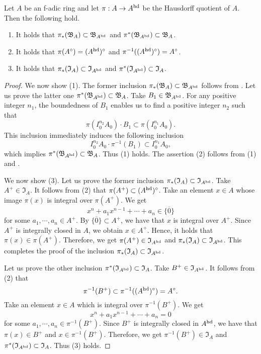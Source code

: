 \begin{prop}\label{p-hd-open}
Let $A$ be an f-adic ring and let $\pi:A \to A^{{\operatorname{hd}}}$ 
be the Hausdorff quotient of $A$. 
Then the following hold. 
\begin{enumerate}
\item 
It holds that $\pi_*(\mathfrak B_A)\subset \mathfrak B_{A^{{\operatorname{hd}}}}$ 
and 
$\pi^*(\mathfrak B_{A^{{\operatorname{hd}}}}) \subset \mathfrak B_A$. 
\item 
It holds that 
$\pi(A^{\circ})=(A^{{\operatorname{hd}}})^{\circ}$ and 
$\pi^{-1}((A^{{\operatorname{hd}}})^{\circ})=A^{\circ}$. 
\item 
It holds that $\pi_*(\mathfrak I_A)\subset \mathfrak I_{A^{{\operatorname{hd}}}}$ 
and 
$\pi^*(\mathfrak I_{A^{{\operatorname{hd}}}}) \subset \mathfrak I_A$.
\end{enumerate}
\end{prop}


\begin{proof}
We now show (1). 
The former inclusion $\pi_*(\mathfrak B_A)\subset \mathfrak B_{A^{{\operatorname{hd}}}}$ 
follows from \cite[Lemma 1.8(i)]{Hub93}. 
Let us prove the latter one $\pi^*(\mathfrak B_{A^{{\operatorname{hd}}}}) \subset \mathfrak B_A$. 
Take $B_1 \in \mathfrak B_{A^{{\operatorname{hd}}}}$. 
For any positive integer $n_1$, 
the boundedness of $B_1$ enables us 
to find a positive integer $n_2$ such that 
$$\pi(I_0^{n_2}A_0) \cdot B_1 \subset \pi(I_0^{n_1}A_0).$$
This inclusion immediately induces the following inclusion
$$I_0^{n_2}A_0 \cdot \pi^{-1}(B_1) \subset I_0^{n_1}A_0,$$
which implies $\pi^*(\mathfrak B_{A^{{\operatorname{hd}}}}) \subset \mathfrak B_A$. 
Thus (1) holds. 
The assertion (2) follows from (1) and \cite[Corollary 1.3(iii)]{Hub93}. 

We now show (3). 
Let us prove the former inclusion 
$\pi_*(\mathfrak I_A)\subset \mathfrak I_{A^{{\operatorname{hd}}}}$. 
Take $A^+ \in \mathfrak I_A$. 
It follows from (2) that $\pi(A^+) \subset (A^{{\operatorname{hd}}})^{\circ}$. 
Take an element $x \in A$ whose image 
$\pi(x)$ is integral over $\pi(A^+)$. 
We get 
$$x^n+a_1x^{n-1}+\cdots+a_n \in \overline{\{0\}}$$
for some $a_1, \cdots, a_n \in A^+$. 
By $\overline{\{0\}} \subset A^+$, we have that $x$ is integral over $A^+$. 
Since $A^+$ is integrally closed in $A$, 
we obtain $x \in A^+$. 
Hence, it holds that $\pi(x) \in \pi(A^+)$. 
Therefore, we get $\pi(A^+) \in \mathfrak I_{A^{{\operatorname{hd}}}}$ and 
$\pi_*(\mathfrak I_A) \subset \mathfrak I_{A^{{\operatorname{hd}}}}$. 
This completes the proof of the inclusion $\pi_*(\mathfrak I_A)\subset \mathfrak I_{A^{{\operatorname{hd}}}}$. 

Let us prove the other inclusion 
$\pi^*(\mathfrak I_{A^{{\operatorname{hd}}}}) \subset \mathfrak I_A$. 
Take $B^+ \in \mathfrak I_{A^{{\operatorname{hd}}}}$. 
It follows from (2) that 
$$\pi^{-1}(B^+) \subset \pi^{-1}((A^{{\operatorname{hd}}})^{\circ})=A^{\circ}.$$ 
Take an element $x \in A$ which is integral over $\pi^{-1}(B^+)$. 
We get 
$$x^n+a_1x^{n-1}+\cdots+a_n=0$$
for some $a_1, \cdots, a_n \in \pi^{-1}(B^+)$. 
Since $B^+$ is integrally closed in $A^{{\operatorname{hd}}}$, 
we have that $\pi(x) \in B^+$ and $x \in \pi^{-1}(B^+)$. 
Therefore, we get $\pi^{-1}(B^+) \in \mathfrak I_{A}$ and 
$\pi^*(\mathfrak I_{A^{{\operatorname{hd}}}}) \subset \mathfrak I_{A}$. 
Thus (3) holds. 
\end{proof}





